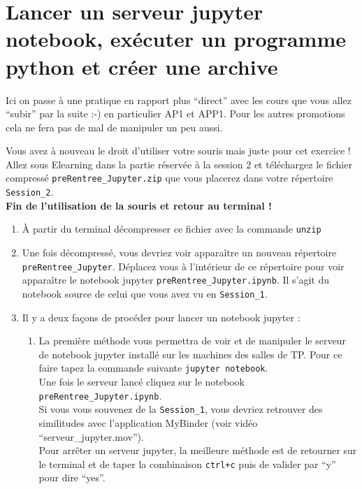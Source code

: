 \documentclass{article}
\begin{document}
\hypertarget{Lancer un serveur jupyter notebook, exécuter un programme python et créer une archive}{%
\section{Lancer un serveur jupyter notebook, exécuter un programme python et créer une archive}\label{Lancer un serveur jupyter notebook, exécuter un programme python et créer une archive}}

Ici on passe à une pratique en rapport plus ``direct'' avec les cours que vous allez ``subir'' par la suite :-) en particulier AP1 et APP1. Pour les autres promotions cela ne fera pas de mal de manipuler un peu aussi. 

\begin{exercice}

Vous avez à nouveau le droit d'utiliser votre souris mais juste pour cet exercice ! 
Allez sous Elearning dans la partie réservée à la session 2 et téléchargez le fichier compressé \texttt{preRentree\_Jupyter.zip} que vous placerez dans votre répertoire \texttt{Session\_2}.\\
\textbf{Fin de l'utilisation de la souris et retour au terminal !}

\begin{enumerate}

\item
À partir du terminal décompresser ce fichier avec la commande \texttt{unzip}
\item
Une fois décompressé, vous devriez voir apparaître un nouveau répertoire \texttt{preRentree\_Jupyter}. Déplacez vous à l'intérieur de ce répertoire pour voir apparaître le notebook jupyter \texttt{preRentree\_Jupyter.ipynb}. Il s'agit du notebook source de celui que vous avez vu en \texttt{Session\_1}. 
\item
Il y a deux fa\c cons de procéder pour lancer un notebook jupyter :

\begin{enumerate}
\item
La première méthode vous permettra de voir et de manipuler le serveur de notebook jupyter installé sur les machines des salles de TP. Pour ce faire tapez la commande suivante 
\texttt{jupyter notebook}.\\
Une fois le serveur lancé cliquez sur le notebook \texttt{preRentree\_Jupyter.ipynb}.\\
Si vous vous souvenez de la \texttt{Session\_1}, vous devriez retrouver des similitudes avec l'application MyBinder (voir vidéo ``serveur\_jupyter.mov'').\\
Pour arrêter un serveur jupyter, la meilleure méthode est de retourner sur le terminal et de taper la combinaison \texttt{ctrl+c} puis de valider par ``y'' pour dire ``yes''.
\medskip


\end{enumerate}
\end{enumerate}
\end{exercice}
\end{document}
